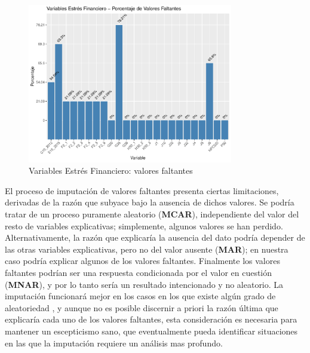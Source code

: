 \documentclass[a4paper, 11pt]{article}
\begin{document}
\begin{figure}[ht]
    \centering
    \includegraphics[width=0.8\textwidth]{images/Stress_Features__Missing_Values.pdf} 
    \caption{Variables Estrés Financiero: valores faltantes}
    \label{fig:stress_features_missing_values}
\end{figure}

El proceso de imputación de valores faltantes presenta ciertas limitaciones, derivadas de la razón que subyace bajo la ausencia de dichos valores. Se podría tratar de un proceso puramente aleatorio (\textbf{MCAR}), independiente del valor
del resto de variables explicativas; simplemente, algunos valores se han perdido. 
Alternativamente, la razón que explicaría la ausencia del dato podría depender de las otras variables explicativas, pero no del valor ausente (\textbf{MAR}); en nuestra caso podría explicar algunos de los valores faltantes. Finalmente los valores faltantes podrían ser una respuesta condicionada por el valor en cuestión 
(\textbf{MNAR}), y por lo tanto sería un resultado intencionado y no aleatorio. 
La imputación funcionará mejor en los casos en los que existe algún grado de aleatoriedad \cite{lantz23}, y aunque no es posible discernir a priori la razón
última que explicaría cada uno de los valores faltantes, esta consideración es
necesaria para mantener un escepticismo sano, que eventualmente pueda identificar
situaciones en las que la imputación requiere un análisis mas profundo.
\end{document}

